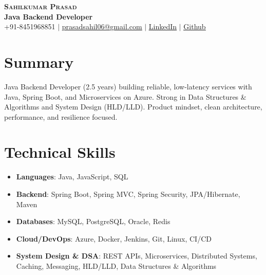 \documentclass[letterpaper,11pt]{article}
\begin{document}
\begin{center}
    \textbf{\Huge \scshape Sahilkumar Prasad} \\ \vspace{1pt}
    \textbf{\Large Java Backend Developer} \\ \vspace{2pt}
    \small +91-8451968851 $|$ \href{mailto:prasadsahil06@gmail.com}{\underline{prasadsahil06@gmail.com}} $|$
    \href{https://www.linkedin.com/in/sahilkumar-prasad-74abba272/}{\underline{LinkedIn}} $|$
    \href{https://github.com/sahill1001}{\underline{Github}}
\end{center}

\section{Summary}
Java Backend Developer (2.5 years) building reliable, low-latency services with Java, Spring Boot, and Microservices on Azure. Strong in Data Structures \& Algorithms and System Design (HLD/LLD). Product mindset, clean architecture, performance, and resilience focused.

\section{Technical Skills}
 \begin{itemize}[leftmargin=0.15in, label={}]
    \item \textbf{Languages}: Java, JavaScript, SQL
    \item \textbf{Backend}: Spring Boot, Spring MVC, Spring Security, JPA/Hibernate, Maven
    \item \textbf{Databases}: MySQL, PostgreSQL, Oracle, Redis
    \item \textbf{Cloud/DevOps}: Azure, Docker, Jenkins, Git, Linux, CI/CD
    \item \textbf{System Design \& DSA}: REST APIs, Microservices, Distributed Systems, Caching, Messaging, HLD/LLD, Data Structures \& Algorithms
 \end{itemize}

\end{document}
